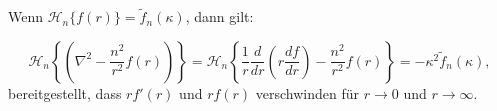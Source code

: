 \begin{satz}
Wenn $\mathscr{H}_n\{f(r)\}=\tilde{f}_n(\kappa)$, dann gilt:

\begin{equation*}
	\mathscr{H}_n \left\{ \left( \nabla^2 - \frac{n^2}{r^2} f(r)\right)\right\}= \mathscr{H}_n\left\{\frac{1}{r}\frac{d}{dr}\left(r\frac{df}{dr}\right) - \frac{n^2}{r^2}f(r)\right\}=-\kappa^2\tilde{f}_{n}(\kappa),
\end{equation*}
bereitgestellt, dass $rf'(r)$ und $rf(r)$ verschwinden für $r\to0$ und $r\to\infty$.
\end{satz}
